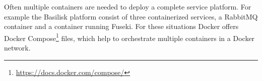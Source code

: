 Often multiple containers are needed to deploy a complete service platform.
For example the Basilisk platform consist of three containerized services, a RabbitMQ container and a container running Fuseki.
For these situations Docker offers Docker Compose\footnote{\url{https://docs.docker.com/compose/}} files, which help to orchestrate multiple containers in a Docker network.



%
%
%
%
%
%
%
%
%



